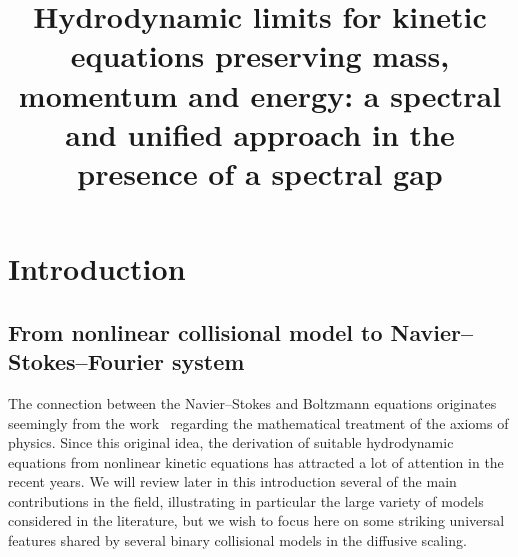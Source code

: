 \documentclass[AHL,Unicode,longabstracts,published]{cedram}
\title[Hydrodynamic limits for kinetic equations]{Hydrodynamic limits for kinetic equations preserving mass, momentum and energy: a spectral and unified approach in the presence of a spectral gap}
\author[\initial{P.} \lastname{Gervais}]{\firstname{Pierre} \lastname{Gervais}}
\author[\initial{B.} \lastname{Lods}]{\firstname{Bertrand} \lastname{Lods}}
\begin{document}
\maketitle
\break
\section{Introduction}



\subsection{From nonlinear collisional model to Navier--Stokes--Fourier system}

The connection between the Navier--Stokes and Boltzmann equations originates seemingly from the work~\cite{H1912} regarding the mathematical treatment of the axioms of physics. Since this original idea, the derivation of suitable hydrodynamic equations from nonlinear kinetic equations has attracted a lot of attention in the recent years. We will review later in this introduction several of the main contributions in the field, illustrating in particular the large variety of models considered in the literature, but we wish to focus here on some striking universal features shared by several binary collisional models in the diffusive scaling.
\end{document}
